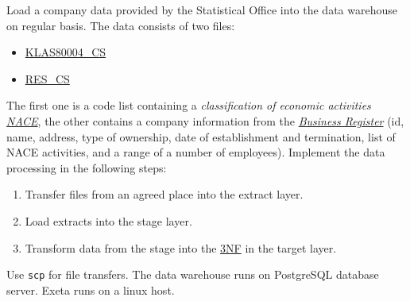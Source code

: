 \documentclass[a4paper,12pt,english,oneside]{book}
\newcommand{\exeta}{Exeta\xspace}
\begin{document}
Load a company data provided by the Statistical Office into the data warehouse on regular basis.
The data consists of two files:
\begin{itemize}
\item \href{file:../tutorial/ext/czso/KLAS80004_CS.20170512000000.dat}{KLAS80004\_CS}
\item \href{file:../tutorial/ext/czso/RES_CS.20170512000000.dat}{RES\_CS}
\end{itemize}
The first one is a code list containing a \emph{classification of economic activities \href{https://en.wikipedia.org/wiki/Statistical_Classification_of_Economic_Activities_in_the_European_Community}{NACE}}, the other contains a company information from the \href{https://www.czso.cz/csu/res/registr_ekonomickych_subjektu}{\emph{Business Register}} (id, name, address, type of ownership, date of establishment and termination, list of NACE activities, and a range of a number of employees). Implement the data processing in the following steps:
\begin{enumerate}
\item Transfer files from an agreed place into the extract layer.
\item Load extracts into the stage layer.
\item Transform data from the stage into the \href{https://en.wikipedia.org/wiki/Third_normal_form}{3NF} in the target layer.
\end{enumerate}
Use \verb|scp| for file transfers. The data warehouse runs on PostgreSQL database server. \exeta runs on a linux host.
\end{document}
